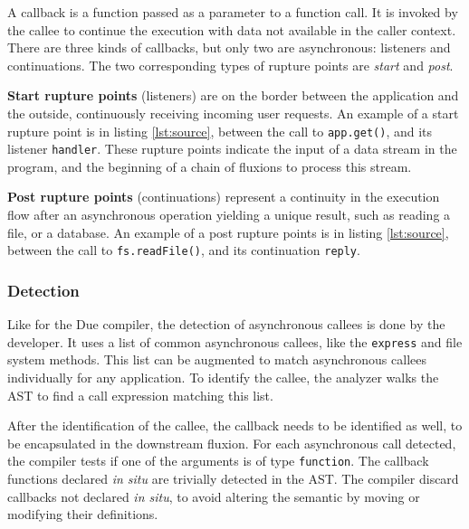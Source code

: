 A callback is a function passed as a parameter to a function call.
It is invoked by the callee to continue the execution with data not available in the caller context.
There are three kinds of callbacks, but only two are asynchronous: listeners and continuations.
The two corresponding types of rupture points are \textit{start} and \textit{post}.

\textbf{Start rupture points} (listeners) are on the border between the application and the outside, continuously receiving incoming user requests.
An example of a start rupture point is in listing \ref{lst:source}, between the call to \texttt{app.get()}, and its listener \texttt{handler}.
These rupture points indicate the input of a data stream in the program, and the beginning of a chain of fluxions to process this stream.

\textbf{Post rupture points} (continuations) represent a continuity in the execution flow after an asynchronous operation yielding a unique result, such as reading a file, or a database.
An example of a post rupture points is in listing \ref{lst:source}, between the call to \texttt{fs.readFile()}, and its continuation \texttt{reply}.

\subsubsection{Detection}

Like for the Due compiler, the detection of asynchronous callees is done by the developer. 
It uses a list of common asynchronous callees, like the \texttt{express} and file system methods.
This list can be augmented to match asynchronous callees individually for any application.
To identify the callee, the analyzer walks the AST to find a call expression matching this list.

After the identification of the callee, the callback needs to be identified as well, to be encapsulated in the downstream fluxion.
For each asynchronous call detected, the compiler tests if one of the arguments is of type \texttt{function}.
The callback functions declared \textit{in situ} are trivially detected in the AST.
The compiler discard callbacks not declared \textit{in situ}, to avoid altering the semantic by moving or modifying their definitions.





